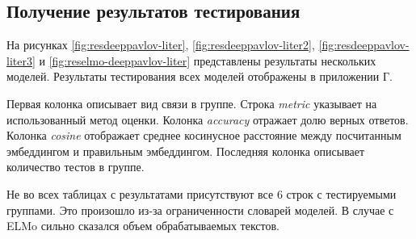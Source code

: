 \documentclass[a4paper,14pt]{article}
\begin{document}
\subsection{Получение результатов тестирования}

На рисунках \ref{fig:resdeeppavlov-liter}, \ref{fig:resdeeppavlov-liter2}, \ref{fig:resdeeppavlov-liter3} и \ref{fig:reselmo-deeppavlov-liter} представлены результаты нескольких моделей.
Результаты тестирования всех моделей отображены в приложении Г.

Первая колонка описывает вид связи в группе.
Строка \textit{metric} указывает на использованный метод оценки.
Колонка \textit{accuracy} отражает долю верных ответов.
Колонка \textit{cosine} отображает среднее косинусное расстояние между посчитанным эмбеддингом и правильным эмбеддингом.
Последняя колонка описывает количество тестов в группе.

Не во всех таблицах с результатами присутствуют все 6 строк с тестируемыми группами.
Это произошло из-за ограниченности словарей моделей.
В случае с ELMo сильно сказался объем обрабатываемых текстов.
\end{document}
